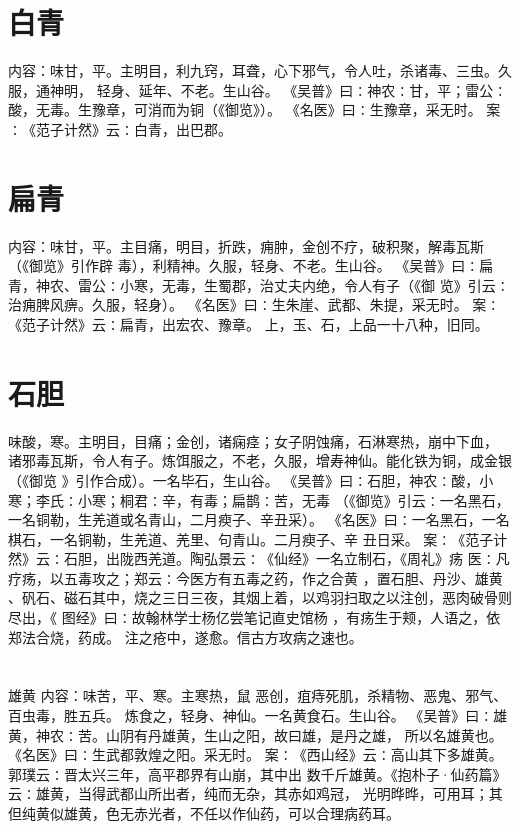 \documentclass[12pt,UTF8]{ctexbook}
\begin{document}
\section{白青}
内容：味甘，平。主明目，利九窍，耳聋，心下邪气，令人吐，杀诸毒、三虫。久服，通神明， 
轻身、延年、不老。生山谷。 
《吴普》曰∶神农∶甘，平；雷公∶酸，无毒。生豫章，可消而为铜（《御览》）。 
《名医》曰∶生豫章，采无时。 
案∶《范子计然》云∶白青，出巴郡。 


\section{扁青}
内容：味甘，平。主目痛，明目，折跌，痈肿，金创不疗，破积聚，解毒瓦斯（《御览》引作辟 
毒），利精神。久服，轻身、不老。生山谷。 
《吴普》曰∶扁青，神农、雷公∶小寒，无毒，生蜀郡，治丈夫内绝，令人有子（《御 
览》引云∶治痈脾风痹。久服，轻身）。 
《名医》曰∶生朱崖、武都、朱提，采无时。 
案∶《范子计然》云∶扁青，出宏农、豫章。 
上，玉、石，上品一十八种，旧同。 

\section{石胆}

味酸，寒。主明目，目痛；金创，诸痫痉；女子阴蚀痛，石淋寒热，崩中下血， 
诸邪毒瓦斯，令人有子。炼饵服之，不老，久服，增寿神仙。能化铁为铜，成金银（《御览 
》引作合成）。一名毕石，生山谷。 
《吴普》曰∶石胆，神农∶酸，小寒；李氏∶小寒；桐君∶辛，有毒；扁鹊∶苦，无毒 
（《御览》引云∶一名黑石，一名铜勒，生羌道或名青山，二月瘐子、辛丑采）。 
《名医》曰∶一名黑石，一名棋石，一名铜勒，生羌道、羌里、句青山。二月瘐子、辛 
丑日采。 
案∶《范子计然》云∶石胆，出陇西羌道。陶弘景云∶《仙经》一名立制石，《周礼》疡 
医∶凡疗疡，以五毒攻之；郑云∶今医方有五毒之药，作之合黄 ，置石胆、丹沙、雄黄 
、矾石、磁石其中，烧之三日三夜，其烟上着，以鸡羽扫取之以注创，恶肉破骨则尽出，《 
图经》曰∶故翰林学士杨亿尝笔记直史馆杨 ，有疡生于颊，人语之，依郑法合烧，药成。 
注之疮中，遂愈。信古方攻病之速也。 






\section{}雄黄
内容：味苦，平、寒。主寒热，鼠 恶创，疽痔死肌，杀精物、恶鬼、邪气、百虫毒，胜五兵。 
炼食之，轻身、神仙。一名黄食石。生山谷。 
《吴普》曰∶雄黄，神农∶苦。山阴有丹雄黄，生山之阳，故曰雄，是丹之雄， 
所以名雄黄也。 
《名医》曰∶生武都敦煌之阳。采无时。 
案∶《西山经》云∶高山其下多雄黄。郭璞云∶晋太兴三年，高平郡界有山崩，其中出 
数千斤雄黄。《抱朴子·仙药篇》云∶雄黄，当得武都山所出者，纯而无杂，其赤如鸡冠， 
光明晔晔，可用耳；其但纯黄似雄黄，色无赤光者，不任以作仙药，可以合理病药耳。 
\end{document}
